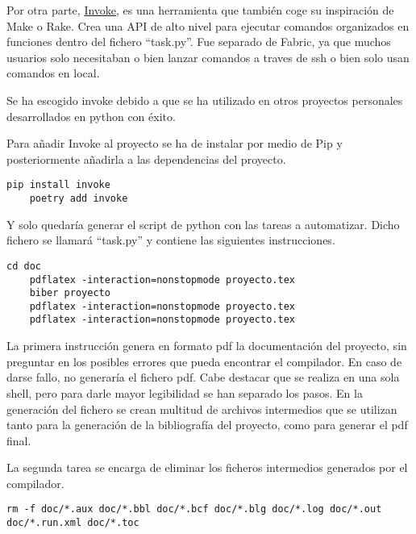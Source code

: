 Por otra parte, \href{https://www.pyinvoke.org/}{Invoke}, es una herramienta que también coge su inspiración de Make o Rake. Crea una \gls{API} de alto nivel para ejecutar comandos organizados en funciones dentro del fichero ``task.py''. Fue separado de Fabric, ya que muchos usuarios solo necesitaban o bien lanzar comandos a traves de ssh o bien solo usan comandos en local. 

Se ha escogido \Gls{invoke} debido a que se ha utilizado en otros proyectos personales desarrollados en \Gls{python} con éxito.

Para añadir Invoke al proyecto se ha de instalar por medio de Pip y posteriormente añadirla a las \glspl{dependencia} del proyecto.
\begin{lstlisting}[style=consola]
	pip install invoke
	poetry add invoke
\end{lstlisting}

Y solo quedaría generar el \gls{script} de python con las tareas a automatizar. Dicho fichero se llamará ``task.py'' y contiene las siguientes instrucciones. 

\begin{lstlisting}[style=consola]
	cd doc
	pdflatex -interaction=nonstopmode proyecto.tex
	biber proyecto
	pdflatex -interaction=nonstopmode proyecto.tex
	pdflatex -interaction=nonstopmode proyecto.tex
\end{lstlisting}
La primera instrucción genera en formato pdf la documentación del proyecto, sin preguntar en los posibles errores que pueda encontrar el compilador. En caso de darse fallo, no generaría el fichero pdf. Cabe destacar que se realiza en una sola \gls{shell}, pero para darle mayor legibilidad se han separado los pasos. En la generación del fichero se crean multitud de archivos intermedios que se utilizan tanto para la generación de la bibliografía del proyecto, como para generar el pdf final. 

La segunda tarea se encarga de eliminar los ficheros intermedios generados por el compilador.
\begin{lstlisting}[style=consola]
	rm -f doc/*.aux doc/*.bbl doc/*.bcf doc/*.blg doc/*.log doc/*.out doc/*.run.xml doc/*.toc
\end{lstlisting}

